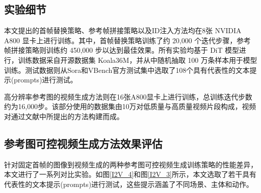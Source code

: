 \subsection{实验细节}
本文提出的首帧替换策略、参考帧拼接策略以及ID注入方法均在8张 NVIDIA A800 显卡上进行训练。其中，首帧替换策略训练了约 20,000 个迭代步骤，参考帧拼接策略则训练约 450,000 步以达到最佳效果。所有实验均基于 DiT 模型进行，训练数据采自开源数据集 Koala36M，并从中随机抽取 100 万条样本用于模型训练。测试数据则从Sora和VBench官方测试集中选取了108个具有代表性的文本提示(prompts)进行测试。

高分辨率参考图的视频生成方法则在16张A800显卡上进行训练，总训练迭代步数约为16,000步。该部分使用的数据集由10万对低质量与高质量视频片段构成，视频对通过文献\cite{wang2021real}中所提出的方法构建而成。

\subsection{参考图可控视频生成方法效果评估}
针对固定首帧的图像到视频生成的两种参考图可控视频生成训练策略的性能差异，本文进行了一系列对比实验。如图\ref{I2V_4}和图\ref{I2V_3}所示，本文选取了若干具有代表性的文本提示(prompts)进行测试，这些提示涵盖了不同场景、主体和动作。


